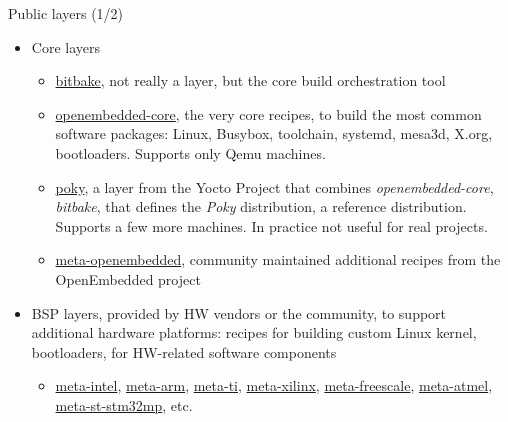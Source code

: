 \begin{frame}{Public layers (1/2)}
  \begin{itemize}
  \item Core layers
    \begin{itemize}
    \item \href{https://git.openembedded.org/bitbake/}{bitbake}, not
      really a layer, but the core build orchestration tool
    \item \href{https://git.openembedded.org/openembedded-core}{openembedded-core},
      the very core recipes, to build the most common software
      packages: Linux, Busybox, toolchain, systemd, mesa3d, X.org,
      bootloaders. Supports only Qemu machines.
    \item \href{https://git.yoctoproject.org/poky/}{poky}, a layer
      from the Yocto Project that combines {\em openembedded-core},
      {\em bitbake}, that defines the {\em Poky} distribution, a
      reference distribution. Supports a few more machines. In
      practice not useful for real projects.
    \item
      \href{http://cgit.openembedded.org/meta-openembedded/}{meta-openembedded},
      community maintained additional recipes from the OpenEmbedded
      project
    \end{itemize}
  \item BSP layers, provided by HW vendors or the community, to
    support additional hardware platforms: recipes for building custom
    Linux kernel, bootloaders, for HW-related software components
    \begin{itemize}
    \item \href{https://git.yoctoproject.org/meta-intel/}{meta-intel},
      \href{https://git.yoctoproject.org/meta-arm/}{meta-arm},
      \href{https://git.yoctoproject.org/meta-ti/}{meta-ti},
      \href{https://git.yoctoproject.org/meta-xilinx/}{meta-xilinx},
      \href{https://git.yoctoproject.org/meta-freescale/}{meta-freescale},
      \href{https://github.com/linux4sam/meta-atmel}{meta-atmel},
      \href{https://github.com/STMicroelectronics/meta-st-stm32mp}{meta-st-stm32mp},
      etc.
    \end{itemize}
  \end{itemize}
\end{frame}

